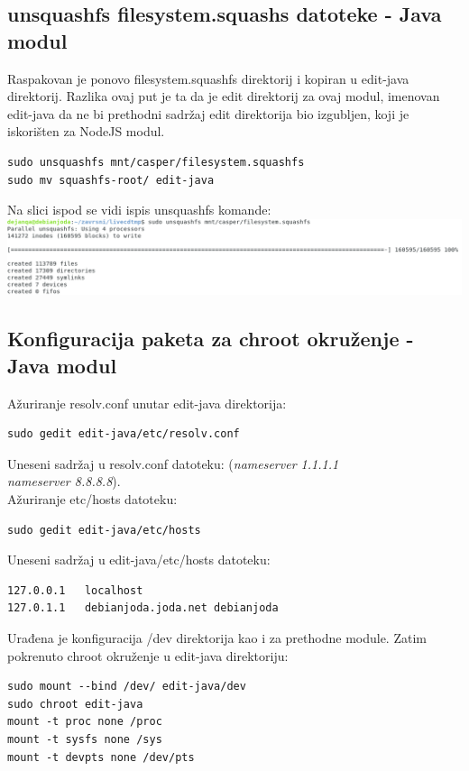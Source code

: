 \documentclass[12pt,vi]{mitthesis}
\begin{document}
\subsection*{unsquashfs filesystem.squashs datoteke - Java modul}
\indent
Raspakovan je ponovo filesystem.squashfs direktorij i kopiran u edit-java direktorij. Razlika ovaj put je ta da je edit direktorij za ovaj modul, imenovan edit-java da ne bi  prethodni sadržaj edit direktorija bio izgubljen, koji je iskorišten za NodeJS modul.\\
\begin{lstlisting}[style=BashInputStyle]
sudo unsquashfs mnt/casper/filesystem.squashfs
sudo mv squashfs-root/ edit-java
\end{lstlisting}
Na slici ispod se vidi ispis unsquashfs komande:\\
\includegraphics[width=\linewidth]{images/unsquashfscommand.png} 

\subsection*{Konfiguracija paketa za chroot okruženje - Java modul}
\noindent
Ažuriranje resolv.conf unutar edit-java direktorija:
\begin{lstlisting}[style=BashInputStyle]
sudo gedit edit-java/etc/resolv.conf
\end{lstlisting}
Uneseni sadržaj u resolv.conf datoteku:
(\textit{nameserver 1.1.1.1 \\
nameserver 8.8.8.8}).\\
\noindent
Ažuriranje etc/hosts datoteku:
\begin{lstlisting}[style=BashInputStyle]
sudo gedit edit-java/etc/hosts
\end{lstlisting}
Uneseni sadržaj u edit-java/etc/hosts datoteku:
\begin{lstlisting}
127.0.0.1	localhost
127.0.1.1	debianjoda.joda.net	debianjoda
\end{lstlisting}

\noindent
Urađena je konfiguracija /dev direktorija kao i za prethodne module. Zatim pokrenuto chroot okruženje u edit-java direktoriju:
\begin{lstlisting}[style=BashInputStyle]
sudo mount --bind /dev/ edit-java/dev
sudo chroot edit-java
mount -t proc none /proc
mount -t sysfs none /sys
mount -t devpts none /dev/pts
\end{lstlisting}
\end{document}
